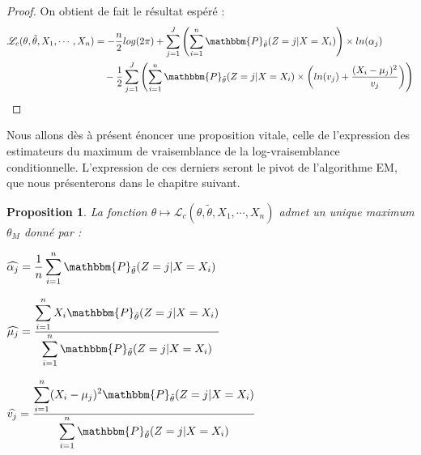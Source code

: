 \documentclass[frenchb]{report}
\newcommand{\1}{\mathbbm{1}}
\newcommand{\prob}{\mathbbm{P}}
\newcommand{\lv}{\mathcal{L}}
\newcommand{\thetat}{\tilde{\theta}}
\newtheorem{prop}{Proposition}
\theoremstyle{definition}\newtheorem{defn}{Définition}
\theoremstyle{definition}\newtheorem{exm}{Exemple}
\theoremstyle{definition}\newtheorem{nota}{Notation}
\theoremstyle{definition}\newtheorem{rem}{Remarque}
\begin{document}
\begin{proof}
On obtient de fait le résultat espéré :
\begin{align*}
 \lv_{c}(\theta, \thetat, X_1, \cdots, X_n) &= -\frac{n}{2}log(2\pi)+\sum_{j=1}^J \left(\sum_{i = 1}^n  \prob_{\thetat}(Z=j|X=X_i)\right) \times ln(\alpha_j)\\
&~~~-\frac{1}{2}\sum_{j=1}^J\left(\sum_{i=1}^n \prob_{\thetat}(Z=j|X=X_i)\times\left(ln(v_j)+\frac{(X_i-\mu_j)^2}{v_j}\right)\right)
\end{align*}
\end{proof}

Nous allons dès à présent énoncer une proposition vitale, celle de l'expression des estimateurs du maximum de vraisemblance de la log-vraisemblance conditionnelle. L'expression de ces derniers seront le pivot de l'algorithme EM, que nous présenterons dans le chapitre suivant.

\begin{prop}La fonction $\theta \mapsto \lv_{c}(\theta,\thetat, X_1, \cdots, X_n)$ admet un unique maximum $\theta_M$ donné par : 
\begin{center}
$\widehat{\alpha_j} = \displaystyle\frac{1}{n}\sum_{i=1}^n \prob_{\thetat}(Z=j|X=X_i)$
\end{center}
\begin{center}

$\widehat{\mu_j}= \displaystyle\frac{\displaystyle\sum_{i=1}^n X_i\prob_{\thetat}(Z=j|X=X_i)}{\displaystyle\sum_{i=1}^n \prob_{\thetat}(Z=j|X=X_i)}$
\end{center}
\begin{center}

$\widehat{v_j} = \displaystyle\frac{\displaystyle\sum_{i=1}^n (X_i -\mu_j)^2 \prob_{\thetat}(Z=j|X=X_i)}{\displaystyle\sum_{i=1}^n\prob_{\thetat}(Z=j|X=X_i)}$
\end{center}
\end{prop}
\end{document}
